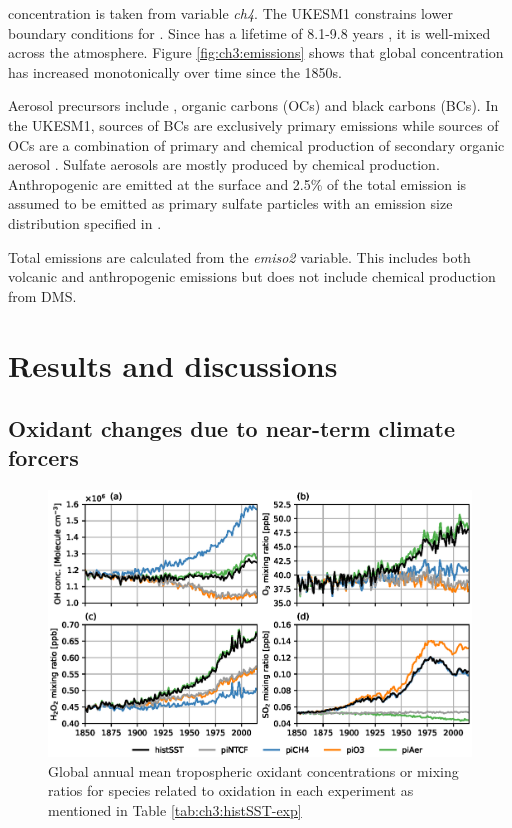  concentration is taken from variable \textit{ch4}. The UKESM1 constrains lower boundary conditions for . Since  has a lifetime of 8.1-9.8 years \citep{oconnorAssessmentPreindustrialPresentday2021}, it is well-mixed across the atmosphere. Figure \ref{fig:ch3:emissions} shows that global  concentration has increased monotonically over time since the 1850s.

Aerosol precursors include , organic carbons (OCs) and black carbons (BCs). In the UKESM1, sources of BCs are exclusively primary emissions while sources of OCs are a combination of primary and chemical production of secondary organic aerosol \citep{mulcahyDescriptionEvaluationAerosol2020}. Sulfate aerosols are mostly produced by chemical production. Anthropogenic  are emitted at the surface and 2.5\% of the total emission is assumed to be emitted as primary sulfate particles with an emission size distribution specified in \citep{stierAerosolclimateModelECHAM5HAM2005}. 

Total  emissions are calculated from the \textit{emiso2} variable. This includes both volcanic and anthropogenic  emissions but does not include chemical production from DMS. 

\section{Results and discussions}
\label{sec:ch3:results}

\subsection{Oxidant changes due to near-term climate forcers}
\begin{figure}
    \centering
    \includegraphics[width=\linewidth]{Chapter3/Figs/f02_oxidant-changes.eps}
    \caption[Global annual mean tropospheric oxidant concentrations or mixing ratios]{Global annual mean tropospheric oxidant concentrations or mixing ratios for species related to  oxidation in each experiment as mentioned in Table \ref{tab:ch3:histSST-exp}}
    \label{fig:ch3:oxidants}
\end{figure}

